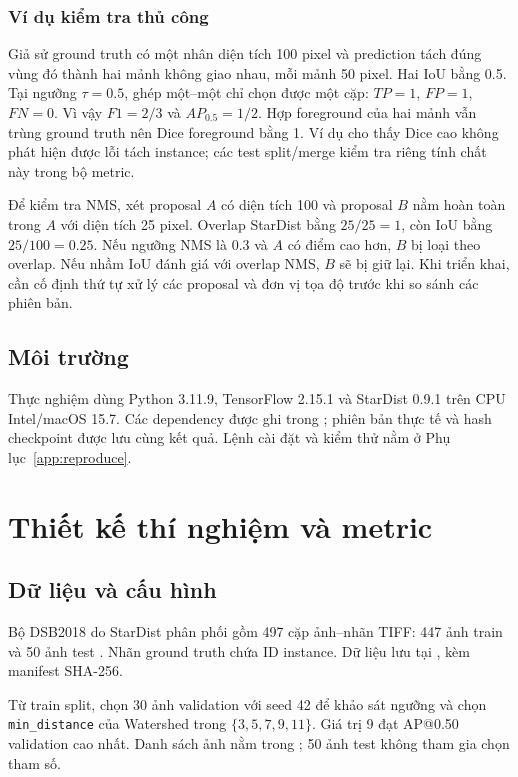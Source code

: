 \documentclass[12pt,a4paper]{report}
\begin{document}
\subsection{Ví dụ kiểm tra thủ công}
Giả sử ground truth có một nhân diện tích 100 pixel và prediction tách đúng
vùng đó thành hai mảnh không giao nhau, mỗi mảnh 50 pixel. Hai IoU bằng 0.5.
Tại ngưỡng $\tau=0.5$, ghép một--một chỉ chọn được một cặp: $TP=1$, $FP=1$,
$FN=0$. Vì vậy $F1=2/3$ và $AP_{0.5}=1/2$. Hợp foreground của hai mảnh vẫn
trùng ground truth nên Dice foreground bằng 1. Ví dụ cho thấy Dice cao không
phát hiện được lỗi tách instance; các test split/merge kiểm tra riêng tính chất
này trong bộ metric.

Để kiểm tra NMS, xét proposal $A$ có diện tích 100 và proposal $B$ nằm hoàn
toàn trong $A$ với diện tích 25 pixel. Overlap StarDist bằng $25/25=1$, còn
IoU bằng $25/100=0.25$. Nếu ngưỡng NMS là 0.3 và $A$ có điểm cao hơn, $B$ bị
loại theo overlap. Nếu nhầm IoU đánh giá với overlap NMS, $B$ sẽ bị giữ lại.
Khi triển khai, cần cố định thứ tự xử lý các proposal và đơn vị tọa độ trước
khi so sánh các phiên bản.

\section{Môi trường}
Thực nghiệm dùng Python 3.11.9, TensorFlow 2.15.1 và StarDist 0.9.1 trên
CPU Intel/macOS 15.7. Các dependency được ghi trong
; phiên bản thực tế và hash checkpoint được lưu
cùng kết quả. Lệnh cài đặt và kiểm thử nằm ở Phụ lục~\ref{app:reproduce}.

\chapter{Thiết kế thí nghiệm và metric}
\section{Dữ liệu và cấu hình}
Bộ DSB2018 do StarDist phân phối gồm 497 cặp ảnh--nhãn TIFF: 447 ảnh train
và 50 ảnh test \citep{caicedo2019nucleus}. Nhãn ground truth chứa ID instance.
Dữ liệu lưu tại , kèm manifest SHA-256.

Từ train split, chọn 30 ảnh validation với seed 42 để khảo sát ngưỡng và chọn
\texttt{min\_distance} của Watershed trong $\{3,5,7,9,11\}$. Giá trị 9 đạt
AP@0.50 validation cao nhất. Danh sách ảnh nằm trong
; 50 ảnh test không tham
gia chọn tham số.
\end{document}
